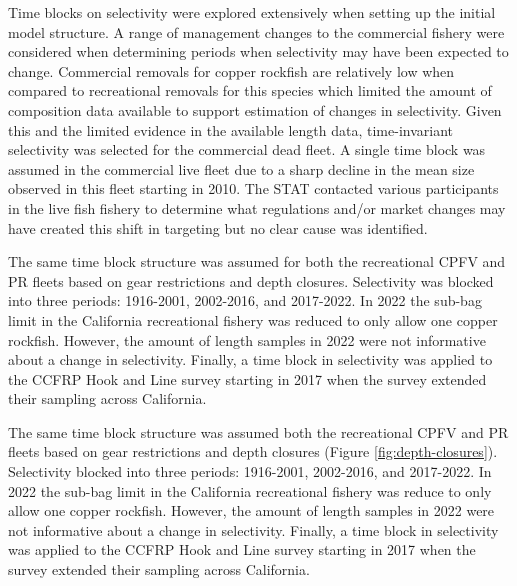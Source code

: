 \documentclass[11pt,
  english,
  letterpaper,
]{article}
\begin{document}
Time blocks on selectivity were explored extensively when setting up the initial model structure. A range of management changes to the commercial fishery were considered when determining periods when selectivity may have been expected to change. Commercial removals for copper rockfish are relatively low when compared to recreational removals for this species which limited the amount of composition data available to support estimation of changes in selectivity. Given this and the limited evidence in the available length data, time-invariant selectivity was selected for the commercial dead fleet. A single time block was assumed in the commercial live fleet due to a sharp decline in the mean size observed in this fleet starting in 2010. The STAT contacted various participants in the live fish fishery to determine what regulations and/or market changes may have created this shift in targeting but no clear cause was identified.

The same time block structure was assumed for both the recreational CPFV and PR fleets based on gear restrictions and depth closures. Selectivity was blocked into three periods: 1916-2001, 2002-2016, and 2017-2022. In 2022 the sub-bag limit in the California recreational fishery was reduced to only allow one copper rockfish. However, the amount of length samples in 2022 were not informative about a change in selectivity. Finally, a time block in selectivity was applied to the CCFRP Hook and Line survey starting in 2017 when the survey extended their sampling across California.

The same time block structure was assumed both the recreational CPFV and PR fleets based on gear restrictions and depth closures (Figure \ref{fig:depth-closures}). Selectivity blocked into three periods: 1916-2001, 2002-2016, and 2017-2022. In 2022 the sub-bag limit in the California recreational fishery was reduce to only allow one copper rockfish. However, the amount of length samples in 2022 were not informative about a change in selectivity. Finally, a time block in selectivity was applied to the CCFRP Hook and Line survey starting in 2017 when the survey extended their sampling across California.
\end{document}
